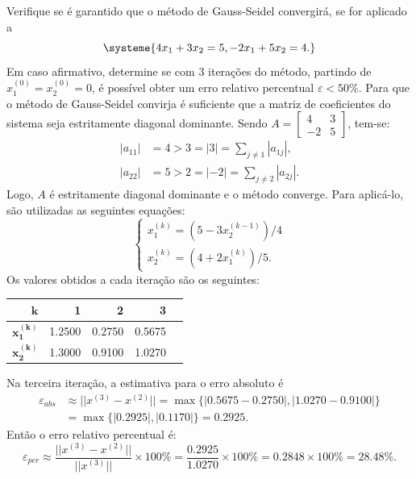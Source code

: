 \documentclass[12pt,a4paper]{article}
\begin{document}
\begin{ExerciseList}
\Exercise[title={2,5}]
Verifique se é garantido que o método de Gauss-Seidel convergirá, se for aplicado a
\[
\systeme{
 4x_1 + 3x_2 = 5,
-2x_1 + 5x_2 = 4.
}
\]
Em caso afirmativo, determine se com 3 iterações do método, partindo de $x_1^{(0)} = x_2^{(0)} = 0$, é possível obter um erro relativo percentual $\varepsilon < 50\%$.
\Answer Para que o método de Gauss-Seidel convirja é suficiente que a matriz de coeficientes do sistema seja estritamente diagonal dominante. Sendo
$
A =
\begin{bmatrix}
4 & 3 \\ -2 & 5
\end{bmatrix}
$, tem-se:
\begin{align*}
|a_{11}| & = 4 > 3 = |3| = \sum_{j \neq 1} |a_{1j}|,\\
|a_{22}| & = 5 > 2 = |-2| = \sum_{j \neq 2} |a_{2j}|.
\end{align*}
Logo, $A$ é estritamente diagonal dominante e o método converge. Para aplicá-lo, são utilizadas as seguintes equações:
\[
\begin{cases}
x_1^{(k)} = (5 -3x_2^{(k-1)})/4\\
x_2^{(k)} = (4 +2x_1^{(k)})/5.
\end{cases}
\]
Os valores obtidos a cada iteração são os seguintes:
\begin{center}
\begin{tabular}{|r|r|r|r|r|}
\hline
$\mathbf{k}$     & 1 & 2 & 3 \\
\hline
$\mathbf{x_1^{(k)}}$ & 1.2500 & 0.2750 & 0.5675 \\
\hline
$\mathbf{x_2^{(k)}}$ & 1.3000 & 0.9100 & 1.0270 \\
\hline
\end{tabular}
\end{center}
\medskip
Na terceira iteração, a estimativa para o erro absoluto é
\begin{align*}
\varepsilon_{abs}
& \approx || x^{(3)} - x^{(2)} ||
= \max\{| 0.5675 - 0.2750 |,
        | 1.0270 - 0.9100|\}\\
& = \max\{ |0.2925|, |0.1170|\}
= 0.2925.
\end{align*}
Então o erro relativo percentual é:
\[
\varepsilon_{per}
\approx
\frac{ || x^{(3)} - x^{(2)} || }{ || x^{(3)} || } \times 100 \%
= \frac{ 0.2925 }{ 1.0270 } \times 100 \% 
= 0.2848 \times 100 \%
= 28.48 \%.
\]



\end{ExerciseList}
\end{document}
